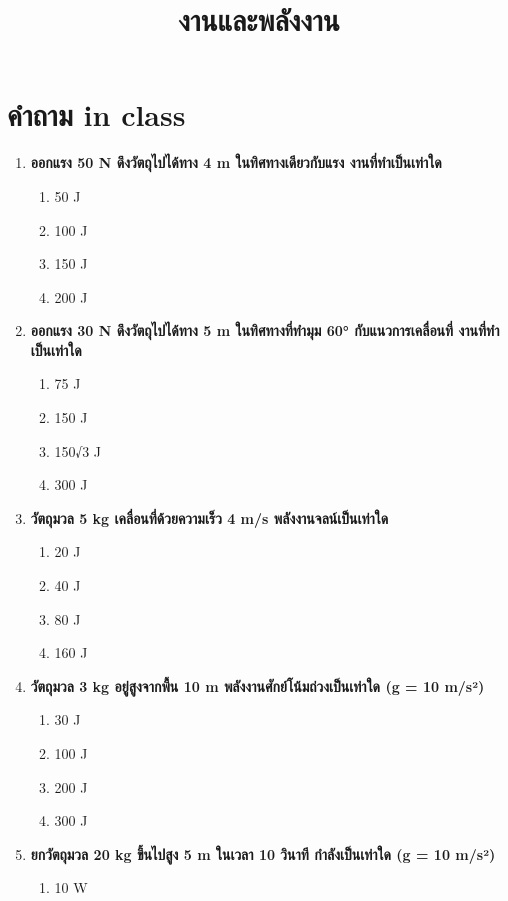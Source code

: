 \documentclass[12pt]{article}
\begin{document}
\title{งานและพลังงาน}
\maketitle
\section*{คำถาม in class}
\begin{enumerate}
\def\labelenumi{\arabic*.}
\normalfont
\item \textbf{ออกแรง 50 N ดึงวัตถุไปได้ทาง 4 m ในทิศทางเดียวกับแรง งานที่ทำเป็นเท่าใด}
\begin{enumerate}[label=\alph*)]
\item 50 J
\item 100 J
\item 150 J
\item 200 J
\end{enumerate}
\item \textbf{ออกแรง 30 N ดึงวัตถุไปได้ทาง 5 m ในทิศทางที่ทำมุม 60° กับแนวการเคลื่อนที่ งานที่ทำเป็นเท่าใด}
\begin{enumerate}[label=\alph*)]
\item 75 J
\item 150 J
\item 150√3 J
\item 300 J
\end{enumerate}
\item \textbf{วัตถุมวล 5 kg เคลื่อนที่ด้วยความเร็ว 4 m/s พลังงานจลน์เป็นเท่าใด}
\begin{enumerate}[label=\alph*)]
\item 20 J
\item 40 J
\item 80 J
\item 160 J
\end{enumerate}
\item \textbf{วัตถุมวล 3 kg อยู่สูงจากพื้น 10 m พลังงานศักย์โน้มถ่วงเป็นเท่าใด (g = 10 m/s²)}
\begin{enumerate}[label=\alph*)]
\item 30 J
\item 100 J
\item 200 J
\item 300 J
\end{enumerate}
\item \textbf{ยกวัตถุมวล 20 kg ขึ้นไปสูง 5 m ในเวลา 10 วินาที กำลังเป็นเท่าใด (g = 10 m/s²)}
\begin{enumerate}[label=\alph*)]
\item 10 W

\end{enumerate}
\end{enumerate}
\end{document}
